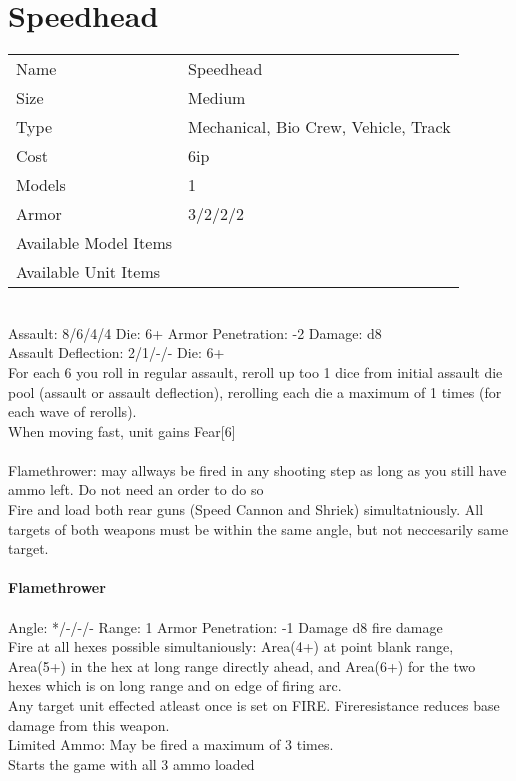 \section{ Speedhead }

\begin{tabular}{ll}
  Name & Speedhead \\
  Size & Medium\\
  Type & Mechanical, Bio Crew, Vehicle, Track\\
  Cost & 6ip\\
  Models & 1\\
  Armor & 3/2/2/2\\
  Available Model Items &  \\
  Available Unit Items &  \\
\end{tabular}

\ \\
Assault: 8/6/4/4 Die: 6+ Armor Penetration: -2 Damage: d8 \\
Assault Deflection: 2/1/-/- Die: 6+\\
\indent For each 6 you roll in regular assault, reroll up too 1 dice from initial assault die pool (assault or assault deflection), rerolling each die a maximum of 1 times (for each wave of rerolls).\\ When moving fast, unit gains Fear[6] \\
\ \\
Flamethrower: may allways be fired in any shooting step as long as you still have ammo left. Do not need an order to do so \\ Fire and load both rear guns (Speed Cannon and Shriek) simultatniously. All targets of both weapons must be within the same angle, but not neccesarily same target.
\ \\
\ \\
{\bf Flamethrower } \\
\ \\
Angle: */-/-/- Range: 1 Armor Penetration: -1 Damage d8 fire damage \\
\indent Fire at all hexes possible simultaniously: Area(4+) at point blank range, Area(5+) in the hex at long range directly ahead, and Area(6+) for the two hexes which is on long range and on edge of firing arc. \\ Any target unit effected atleast once is set on FIRE. Fireresistance reduces base damage from this weapon. \\ Limited Ammo: May be fired a maximum of 3 times. \\ Starts the game with all 3 ammo loaded \\



